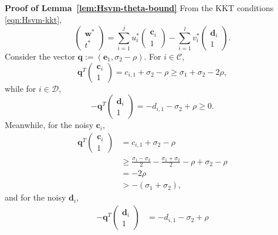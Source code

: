 \documentclass[twoside,11pt]{article}
\renewcommand{\c}{\bm{c}}
\renewcommand{\d}{\bm{d}}
\newcommand\q{\bm{q}}
\newcommand\w{\bm{w}}
\newcommand\e{\bm{e}}
\newcommand\CC{\mathcal{C}}
\newcommand\DD{\mathcal{D}}
\newenvironment{proofof}[1]
  {\par\noindent\textbf{Proof of #1}\enspace\ignorespaces}
  {\hfill\BlackBox\\[2mm]}
\begin{document}
\begin{proofof}{Lemma~\ref{lem:Hsvm-theta-bound}}
    From the KKT conditions \eqref{eqn:Hsvm-kkt},
    \begin{equation} \label{eqn:margin-bound-kkt-rel}
        \begin{pmatrix}
            \w^*\\
            t^*
        \end{pmatrix} = \sum_{i=1}^j u_i^*\begin{pmatrix}
            \c_i\\
            1
        \end{pmatrix} - \sum_{i=1}^l v_i^*\begin{pmatrix}
            \d_i\\
            1
        \end{pmatrix}.
    \end{equation}
    Consider the vector $\q := (\e_1,\sigma_2 - \rho)$. For $i \in \CC$,
    \[
        \q^T\begin{pmatrix}
            \c_i\\
            1
        \end{pmatrix} = c_{i,1} + \sigma_2 - \rho \geq \sigma_1 + \sigma_2 - 2\rho,
    \]
    while for $i \in \DD$,
    \[
        -\q^T\begin{pmatrix}
            \d_i\\
            1
        \end{pmatrix} = -d_{i,1} - \sigma_2 + \rho \geq 0.
    \]
    Meanwhile, for the noisy $\c_i$,
    \begin{align*}
        \q^T\begin{pmatrix}
            \c_i\\
            1
        \end{pmatrix} &= c_{i,1} + \sigma_2 - \rho\\
                      &\geq \frac{\sigma_1 - \sigma_2}{2} - \frac{\sigma_1 + \sigma_2}{2} - \rho + \sigma_2 - \rho\\
                      &= -2\rho\\
                      &> -(\sigma_1 + \sigma_2),
    \end{align*}
    and for the noisy $\d_i$,
    \begin{align*}
        -\q^T\begin{pmatrix}
            \d_i\\
            1
        \end{pmatrix} &= -d_{i,1} - \sigma_2 + \rho\\

\end{align*}
\end{proofof}
\end{document}
